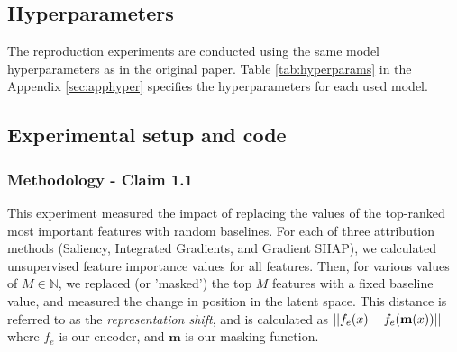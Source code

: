 \subsection{Hyperparameters}

The reproduction experiments are conducted using the same model hyperparameters as in the original paper. Table \ref{tab:hyperparams} in the Appendix \ref{sec:apphyper} specifies the hyperparameters for each used model. %




\subsection{Experimental setup and code}

\subsubsection{Methodology - Claim 1.1}
This experiment measured the impact of replacing the values of the top-ranked most important features with random baselines. For each of three attribution methods (Saliency, Integrated Gradients, and Gradient SHAP), we calculated unsupervised feature importance values for all features. Then, for various values of $M \in \mathbb{N}$, we replaced (or 'masked') the top $M$ features with a fixed baseline value, and measured the change in position in the latent space. This distance is referred to as the \textit{representation shift}, and is calculated as $||\boldmath{f}_e(\boldmath{x})-\boldmath{f}_e(\mathbf{m}(x))||$ where $f_e$ is our encoder, and $\mathbf{m}$ is our masking function.

\vspace{1em}

